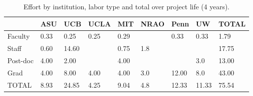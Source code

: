 \documentclass[preprint]{aastex}
\begin{document}
\begin{table}[htb]
\centering
\caption{Effort by institution, labor type and total over project life (4 years).}
\label{tab:ftetot}
\begin{tabular}{| p{0.6in}  |  p{0.5in}  |p{0.5in}  |p{0.5in}  |p{0.5in}  |p{0.5in}  |p{0.5in}  |p{0.5in}  | p{0.5in}  |} \hline
                 &  ASU & UCB    &  UCLA  &  MIT  & NRAO  &  Penn  & UW  & TOTAL \\ \hline
Faculty     &  0.33  & 0.25    &   0.25   &  0.29  &              & 0.33    & 0.33  &  1.79  \\ \hline
Staff         &  0.60  & 14.60  &              &  0.75  &  1.8      &            &           &  17.75  \\ \hline
Post-doc  &   4.00 &  2.00   &              &   4.00  &            &            &  3.0    &   13.00  \\ \hline
Grad        &   4.00  & 8.00   &   4.00     &  4.00  &  3.0     & 12.00   &  8.0    &  43.00 \\ \hline
TOTAL     &   8.93  & 24.85  &  4.25    &   9.04  &  4.8     &  12.33  & 11.33  & 75.54 \\ \hline
\end{tabular}
\end{table}
\end{document}
